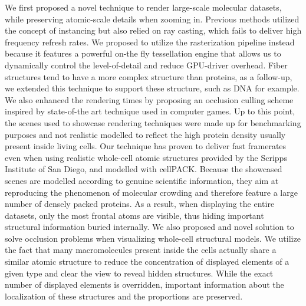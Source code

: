 We first proposed a novel technique to render large-scale molecular datasets, while preserving atomic-scale details when zooming in.
Previous methods utilized the concept of instancing but also relied on ray casting, which fails to deliver high frequency refresh rates. 
We proposed to utilize the rasterization pipeline instead because it features a powerful on-the fly tessellation engine that allows us to dynamically control the level-of-detail and reduce GPU-driver overhead. 
Fiber structures tend to have a more complex structure than proteins, as a follow-up, we extended this technique to support these structure, such as DNA for example.
We also enhanced the rendering times by proposing an occlusion culling scheme inspired by state-of-the art technique used in computer games. 
Up to this point, the scenes used to showcase rendering techniques were made up for benchmarking purposes and not realistic modelled to reflect the high protein density usually present inside living cells.
Our technique has proven to deliver fast framerates even when using realistic whole-cell atomic structures provided by the Scripps Institute of San Diego, and modelled with cellPACK.
Because the showcased scenes are modelled according to genuine scientific information, they aim at reproducing the phenomenon of molecular crowding and therefore feature a large number of densely packed proteins.
As a result, when displaying the entire datasets, only the most frontal atoms are visible, thus hiding important structural information buried internally.
We also proposed and novel solution to solve occlusion problems when visualizing whole-cell structural models.
We utilize the fact that many macromolecules present inside the cells actually share a similar atomic structure to reduce the concentration of displayed elements of a given type and clear the view to reveal hidden structures.
While the exact number of displayed elements is overridden, important information about the localization of these structures and the proportions are preserved.

